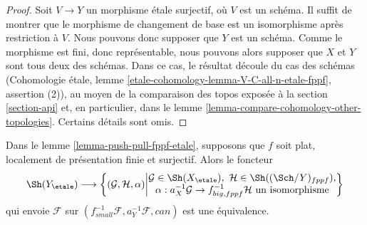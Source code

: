 \begin{proof}
Soit $V \to Y$ un morphisme étale surjectif, où $V$ est un schéma.
Il suffit de montrer que le morphisme de changement de base est un isomorphisme
après restriction à $V$. Nous pouvons donc supposer que $Y$ est un schéma.
Comme le morphisme est fini, donc représentable, nous pouvons alors supposer
que $X$ et $Y$ sont tous deux des schémas. Dans ce cas, le résultat découle du
cas des schémas (Cohomologie étale, lemme
\ref{etale-cohomology-lemma-V-C-all-n-etale-fppf}, assertion (2)), au moyen de
la comparaison des topos exposée à la section \ref{section-api} et, en
particulier, dans le lemme \ref{lemma-compare-cohomology-other-topologies}.
Certains détails sont omis.
\end{proof}

\begin{lemma}
\label{lemma-descent-sheaf-fppf-etale}
Dans le lemme \ref{lemma-push-pull-fppf-etale}, supposons que
$f$ soit plat, localement de présentation finie et surjectif.
Alors le foncteur
$$
\Sh(Y_\etale) \longrightarrow
\left\{
(\mathcal{G}, \mathcal{H}, \alpha)
\middle|
\begin{matrix}
\mathcal{G} \in \Sh(X_\etale),\ \mathcal{H} \in \Sh((\Sch/Y)_{fppf}), \\
\alpha : a_X^{-1}\mathcal{G} \to f_{big, fppf}^{-1}\mathcal{H}
\text{ un isomorphisme}
\end{matrix}
\right\}
$$
qui envoie $\mathcal{F}$ sur
$(f_{small}^{-1}\mathcal{F}, a_Y^{-1}\mathcal{F}, can)$ est une équivalence.
\end{lemma}

